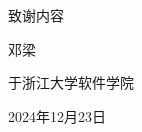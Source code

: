 \cleardoublepage
{}
{%
    致谢内容

    \begin{flushright}
        邓梁

        于浙江大学软件学院

        2024年12月23日
    \end{flushright}
}